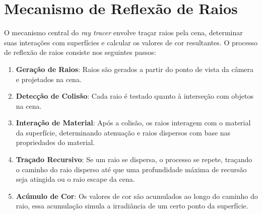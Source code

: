 \documentclass[english, 
               brazil, 
               bsc] %
               {dcomp-abntex2}
\begin{document}
\section{Mecanismo de Reflexão de Raios}

O mecanismo central do \textit{ray tracer} envolve traçar raios pela cena, determinar suas interações com superfícies e calcular os valores de cor resultantes. O processo de reflexão de raios consiste nos seguintes passos:

\begin{enumerate}
\item \textbf{Geração de Raios}: Raios são gerados a partir do ponto de vista da câmera e projetados na cena.
\item \textbf{Detecção de Colisão}: Cada raio é testado quanto à interseção com objetos na cena.
\item \textbf{Interação de Material}: Após a colisão, os raios interagem com o material da superfície, determinando atenuação e raios dispersos com base nas propriedades do material.
\item \textbf{Traçado Recursivo}: Se um raio se dispersa, o processo se repete, traçando o caminho do raio disperso até que uma profundidade máxima de recursão seja atingida ou o raio escape da cena.
\item \textbf{Acúmulo de Cor}: Os valores de cor são acumulados ao longo do caminho do raio, essa acumulação simula a irradiância de um certo ponto da superfície.

\end{enumerate}

% 

% 
% 
% 
% 




\postextual

\renewcommand{\chapnumfont}{\chaptitlefont}
\renewcommand{\afterchapternum}{}
% 
% 
\end{document}
